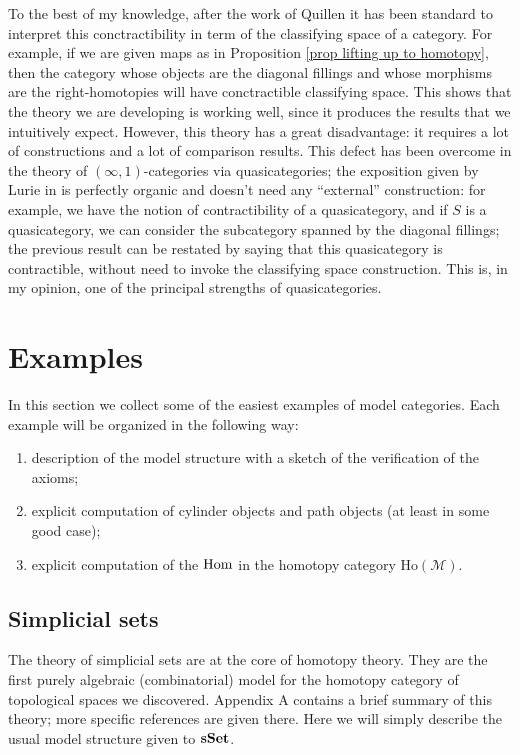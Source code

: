 \begin{refsection}
\begin{rmk}
To the best of my knowledge, after the work of Quillen it has been standard to interpret this conctractibility in term of the classifying space of a category. For example, if we are given maps as in Proposition \ref{prop lifting up to homotopy}, then the category whose objects are the diagonal fillings and whose morphisms are the right-homotopies will have conctractible classifying space. This shows that the theory we are developing is working well, since it produces the results that we intuitively expect. However, this theory has a great disadvantage: it requires a lot of constructions and a lot of comparison results. This defect has been overcome in the theory of $(\infty,1)$-categories via quasicategories; the exposition given by Lurie in \cite{htt} is perfectly organic and doesn't need any ``external'' construction: for example, we have the notion of contractibility of a quasicategory, and if $S$ is a quasicategory, we can consider the subcategory spanned by the diagonal fillings; the previous result can be restated by saying that this quasicategory is contractible, without need to invoke the classifying space construction. This is, in my opinion, one of the principal strengths of quasicategories.
\end{rmk}

\section{Examples}

In this section we collect some of the easiest examples of model categories. Each example will be organized in the following way:

\begin{enumerate}
\item description of the model structure with a sketch of the verification of the axioms;
\item explicit computation of cylinder objects and path objects (at least in some good case);
\item explicit computation of the $\mathrm{Hom}$ in the homotopy category $\mathrm{Ho}(\mathcal M)$.
\end{enumerate}

\subsection{Simplicial sets}

The theory of simplicial sets are at the core of homotopy theory. They are the first purely algebraic (combinatorial) model for the homotopy category of topological spaces we discovered. Appendix A contains a brief summary of this theory; more specific references are given there. Here we will simply describe the usual model structure given to $\mathbf{sSet}$.


\end{refsection}

